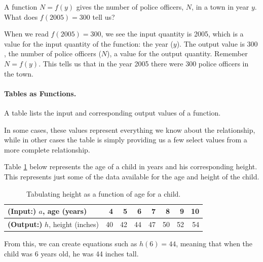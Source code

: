 \begin{example}
A function $N = f(y)$ gives the number of police officers, $N$, in a town in year $y$. What does $f(2005) = 300$ tell us?

\begin{solution} When we read $f(2005) = 300$, we see the input quantity is 2005, which is a value for the input quantity of the function: the year ($y$). The output value is $300$, the number of police officers ($N$), a value for the output quantity. Remember $N=f(y)$. This tells us that in the year 2005 there were 300 police officers in the town.
\end{solution}\end{example}

\paragraph{Tables as Functions.}

A table lists the input and corresponding output values of a function.

In some cases, these values represent everything we know about the relationship, while in other cases the table is simply providing us a few select values from a more complete relationship.

Table \ref{tab:function} below represents the age of a child in years and his
corresponding height. This represents just some of the data available
for the age and height of the child.

\begin{table}[ht!]
\begin{centering}
\begin{tabular}{l*{7}{r}}
\toprule
{\bf (Input:)} $a$, age (years) & 4 & 5 & 6 & 7 & 8 & 9 & 10\\
\midrule
{\bf (Output:)} $h$, height (inches) & 40 & 42 & 44 & 47 & 50 & 52 & 54\\
\bottomrule
\end{tabular}
\caption{Tabulating height as a function of age for a child.}
\label{tab:function}
\end{centering}
\end{table}
From this, we can create equations such as $h(6) = 44$, meaning that when the child was 6 years old, he was 44 inches tall.


